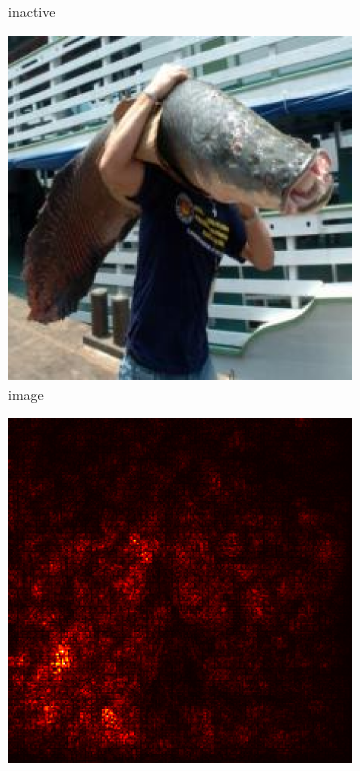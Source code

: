 \documentclass[preprint,12pt]{elsarticle}
\begin{document}
\begin{figure}
\begin{subfigure}{0.14\textwidth}
        \caption{inactive}
    \end{subfigure}
    \hfill
    \begin{subfigure}{0.14\linewidth}
    \centering
    \includegraphics[width=\linewidth]{../visualizations/examples/imagenette/resnet18/images/4.png}
    \caption{image}
    \end{subfigure}
    \hfill
    \begin{subfigure}{0.14\linewidth}
        \centering
        \includegraphics[width=\linewidth]{../visualizations/examples/imagenette/resnet18/saliency_map/4.png}

\end{subfigure}
\end{figure}
\end{document}
